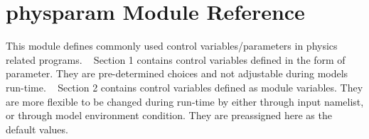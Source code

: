 \hypertarget{namespacephysparam}{}\section{physparam Module Reference}
\label{namespacephysparam}


This module defines commonly used control variables/parameters in physics related programs. ~\newline
 Section 1 contains control variables defined in the form of parameter. They are pre-\/determined choices and not adjustable during model\textquotesingle{}s run-\/time. ~\newline
 Section 2 contains control variables defined as module variables. They are more flexible to be changed during run-\/time by either through input namelist, or through model environment condition. They are preassigned here as the default values.  



